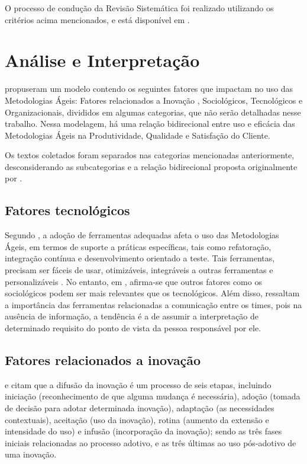 O processo de condução da Revisão Sistemática foi realizado utilizando os critérios acima mencionados, e está disponível em \cite{fcas}.

\section{Análise e Interpretação}

\citeauthor{Senapathi2012} \citeyear{Senapathi2012} propuseram um modelo contendo os seguintes fatores que impactam no uso das Metodologias Ágeis: Fatores relacionados a Inovação , Sociológicos, Tecnológicos e Organizacionais, divididos em algumas categorias, que não serão detalhadas nesse trabalho. Nessa modelagem, há uma relação bidirecional entre uso e eficácia das Metodologias Ágeis na Produtividade, Qualidade e Satisfação do Cliente.

Os textos coletados foram separados nas categorias mencionadas anteriormente, desconsiderando as subcategorias e a relação bidirecional proposta originalmente por \citeauthor{Senapathi2012} \citeyear{Senapathi2012}.

\subsection{Fatores tecnológicos}

Segundo \citeauthor{Senapathi2014} \citeyear{Senapathi2014}, a adoção de ferramentas adequadas afeta o uso das Metodologias Ágeis, em termos de suporte a práticas específicas, tais como refatoração, integração contínua e desenvolvimento orientado a teste. Tais ferramentas, precisam ser fáceis de usar, otimizáveis, integráveis a outras ferramentas e personalizáveis \citeauthor{Azizyan2011} \citeyear{Azizyan2011}. No entanto, em \citeauthor{Asnawi2011} \citeyear{Asnawi2011}, afirma-se que outros fatores como os sociológicos podem ser mais relevantes que os tecnológicos. Além disso, ressaltam a importância das ferramentas relacionadas a comunicação entre os times, pois na ausência de informação, a tendência é a de assumir a interpretação de determinado requisito do ponto de vista da pessoa responsável por ele.

\subsection{Fatores relacionados a inovação}

\citeauthor{Senapathi2011} \citeyear{Senapathi2011} e \citeauthor{Senapathi2012} \citeyear{Senapathi2012} citam que a difusão da inovação é um processo de seis etapas, incluindo iniciação (reconhecimento de que alguma mudança é necessária), adoção (tomada de decisão para adotar determinada inovação), adaptação (as necessidades contextuais), aceitação (uso da inovação), rotina (aumento da extensão e intensidade do uso) e infusão (incorporação da inovação); sendo as três fases iniciais relacionadas ao processo adotivo, e as três últimas ao uso pós-adotivo de uma inovação.

